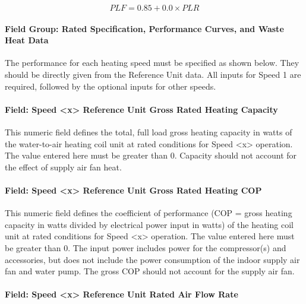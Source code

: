 \begin{equation}
PLF = 0.85 + 0.0 \times PLR
\end{equation}

\paragraph{Field Group: Rated Specification, Performance Curves, and Waste Heat Data}\label{field-group-rated-specification-performance-curves-and-waste-heat-data-2}

The performance for each heating speed must be specified as shown below. They should be directly given from the Reference Unit data. All inputs for Speed 1 are required, followed by the optional inputs for other speeds.

\paragraph{Field: Speed \textless{}x\textgreater{} Reference Unit Gross Rated Heating Capacity}\label{field-speed-x-reference-unit-gross-rated-heating-capacity-1}

This numeric field defines the total, full load gross heating capacity in watts of the water-to-air heating coil unit at rated conditions for Speed \textless{}x\textgreater{} operation. The value entered here must be greater than 0. Capacity should not account for the effect of supply air fan heat.

\paragraph{Field: Speed \textless{}x\textgreater{} Reference Unit Gross Rated Heating COP}\label{field-speed-x-reference-unit-gross-rated-heating-cop-1}

This numeric field defines the coefficient of performance (COP = gross heating capacity in watts divided by electrical power input in watts) of the heating coil unit at rated conditions for Speed \textless{}x\textgreater{} operation. The value entered here must be greater than 0. The input power includes power for the compressor(s) and accessories, but does not include the power consumption of the indoor supply air fan and water pump. The gross COP should not account for the supply air fan.

\paragraph{Field: Speed \textless{}x\textgreater{} Reference Unit Rated Air Flow Rate}\label{field-speed-x-reference-unit-rated-air-flow-rate-3}

